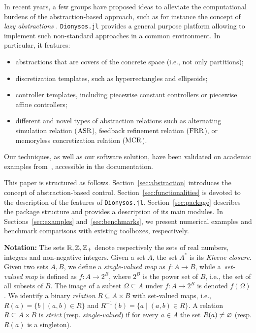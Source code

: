 \documentclass{juliacon}
\begin{document}
\vskip 6pt
In recent years, a few groups have proposed ideas to alleviate the computational burdens of the abstraction-based approach, such as for instance the concept of \emph{lazy abstractions} \cite{camara2011safety,girard2015safety,tazaki2009discrete,hsu2018multi}.
\texttt{Dionysos.jl} provides a general purpose platform allowing to implement such non-standard approaches in a common environment. In particular, it features:
\begin{itemize}
    \item abstractions that are covers of the concrete space (i.e., not only partitions);
    \item discretization templates, such as hyperrectangles and ellipsoids;
    \item controller templates, including piecewise constant controllers or piecewise affine controllers;
    \item different and novel types of abstraction relations such as alternating simulation relation ($\operatorname{ASR}$), feedback refinement relation ($\operatorname{FRR}$), or memoryless concretization relation ($\operatorname{MCR}$).
\end{itemize}


\vskip 6pt
%
Our techniques, as well as our software solution, have been validated on academic examples from~\cite{girard2009approximately,mouelhi2013cosyma,reissig2016feedback,gol2014language}, accessible in the documentation.

\vskip 6pt
This paper is structured as follows.  Section~\ref{sec:abstraction} introduces the concept of abstraction-based control. Section~\ref{sec:functionalities} is devoted to the description of the features of \texttt{Dionysos.jl}. Section~\ref{sec:package} describes the package structure and provides a description of its main modules. In Sections~\ref{sec:examples} and~\ref{sec:benchmarks}, we present numerical examples and benchmark comparisons with existing toolboxes, respectively.

\vskip 6pt
\noindent \textbf{Notation:} 
The sets $\mathbb{R},\mathbb{Z}, \mathbb{Z}_+$ denote respectively the sets of real numbers, integers and non-negative integers.
Given a set $A$, the set $A^*$ is its \emph{Kleene closure}. 
Given two sets $A,B$, we define a \emph{single-valued map} as $f:A\rightarrow B$, while a~\emph{set-valued map} is defined as $f:A\rightarrow 2^B$, where $2^B$ is the power set of $B$, i.e., the set of all subsets of $B$. 
The image of a subset $\Omega\subseteq A$ under $f:A\rightarrow 2^B$ is denoted $f(\Omega)$.
We identify a binary \emph{relation} $R\subseteq A \times B$ with set-valued maps, i.e., $R(a) = \{b \mid (a, b)\in R\}$ and $R^{-1}(b) =\{ a \mid (a, b)\in R\}$.
%
A relation $R\subseteq A\times B$ is \emph{strict} (resp. \emph{single-valued}) if for every $a\in A$ the set $R(a)\ne \varnothing$ (resp. $R(a)$ is a singleton). 
\end{document}

